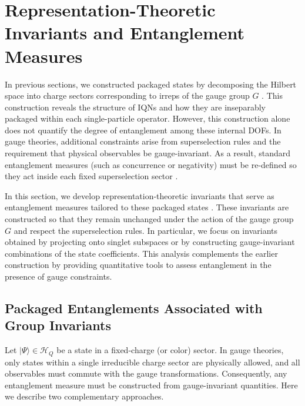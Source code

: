 \documentclass[12pt,a4paper]{article}
\begin{document}
\section{Representation-Theoretic Invariants and Entanglement Measures}
\label{SEC:RepresentationTheoreticInvariantsAndEntanglementMeasures}


In previous sections, we constructed packaged states by decomposing the Hilbert space into charge sectors corresponding to irreps of the gauge group $G$ \cite{DHR1971,DHR1974,StreaterWightman2001}.
This construction reveals the structure of IQNs and how they are inseparably packaged within each single-particle operator.
However, this construction alone does not quantify the degree of entanglement among these internal DOFs.
In gauge theories, additional constraints arise from superselection rules and the requirement that physical observables be gauge-invariant.
As a result, standard entanglement measures (such as concurrence or negativity) must be re-defined so they act inside each fixed superselection sector \cite{Peres1996,Barnum2004,BartlettRudolphSpekkens2006,BuerschaperAguado2009}.


In this section, we develop representation-theoretic invariants that serve as entanglement measures tailored to these packaged states \cite{Wootters1998,VidalTarrach1999,VidalCirac2000,Rains2000}.
These invariants are constructed so that they remain unchanged under the action of the gauge group $G$ and respect the superselection rules.
In particular, we focus on invariants obtained by projecting onto singlet subspaces or by constructing gauge-invariant combinations of the state coefficients.
This analysis complements the earlier construction by providing quantitative tools to assess entanglement in the presence of gauge constraints.



\subsection{Packaged Entanglements Associated with Group Invariants}


Let $|\Psi\rangle\in\mathcal H_Q$ be a state in a fixed-charge (or color) sector.
In gauge theories, only states within a single irreducible charge sector are physically allowed, and all observables must commute with the gauge transformations.
Consequently, any entanglement measure must be constructed from gauge-invariant quantities.
Here we describe two complementary approaches.
\end{document}
